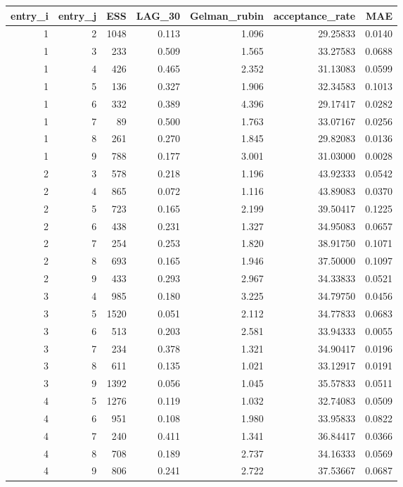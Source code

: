\begin{longtable}{rrrrrrr}
\toprule
entry\_i & entry\_j & ESS & LAG\_30 & Gelman\_rubin & acceptance\_rate & MAE \\ 
\midrule
1 & 2 & 1048 & 0.113 & 1.096 & 29.25833 & 0.0140 \\ 
1 & 3 & 233 & 0.509 & 1.565 & 33.27583 & 0.0688 \\ 
1 & 4 & 426 & 0.465 & 2.352 & 31.13083 & 0.0599 \\ 
1 & 5 & 136 & 0.327 & 1.906 & 32.34583 & 0.1013 \\ 
1 & 6 & 332 & 0.389 & 4.396 & 29.17417 & 0.0282 \\ 
1 & 7 & 89 & 0.500 & 1.763 & 33.07167 & 0.0256 \\ 
1 & 8 & 261 & 0.270 & 1.845 & 29.82083 & 0.0136 \\ 
1 & 9 & 788 & 0.177 & 3.001 & 31.03000 & 0.0028 \\ 
2 & 3 & 578 & 0.218 & 1.196 & 43.92333 & 0.0542 \\ 
2 & 4 & 865 & 0.072 & 1.116 & 43.89083 & 0.0370 \\ 
2 & 5 & 723 & 0.165 & 2.199 & 39.50417 & 0.1225 \\ 
2 & 6 & 438 & 0.231 & 1.327 & 34.95083 & 0.0657 \\ 
2 & 7 & 254 & 0.253 & 1.820 & 38.91750 & 0.1071 \\ 
2 & 8 & 693 & 0.165 & 1.946 & 37.50000 & 0.1097 \\ 
2 & 9 & 433 & 0.293 & 2.967 & 34.33833 & 0.0521 \\ 
3 & 4 & 985 & 0.180 & 3.225 & 34.79750 & 0.0456 \\ 
3 & 5 & 1520 & 0.051 & 2.112 & 34.77833 & 0.0683 \\ 
3 & 6 & 513 & 0.203 & 2.581 & 33.94333 & 0.0055 \\ 
3 & 7 & 234 & 0.378 & 1.321 & 34.90417 & 0.0196 \\ 
3 & 8 & 611 & 0.135 & 1.021 & 33.12917 & 0.0191 \\ 
3 & 9 & 1392 & 0.056 & 1.045 & 35.57833 & 0.0511 \\ 
4 & 5 & 1276 & 0.119 & 1.032 & 32.74083 & 0.0509 \\ 
4 & 6 & 951 & 0.108 & 1.980 & 33.95833 & 0.0822 \\ 
4 & 7 & 240 & 0.411 & 1.341 & 36.84417 & 0.0366 \\ 
4 & 8 & 708 & 0.189 & 2.737 & 34.16333 & 0.0569 \\ 
4 & 9 & 806 & 0.241 & 2.722 & 37.53667 & 0.0687 \\ 

\end{longtable}
